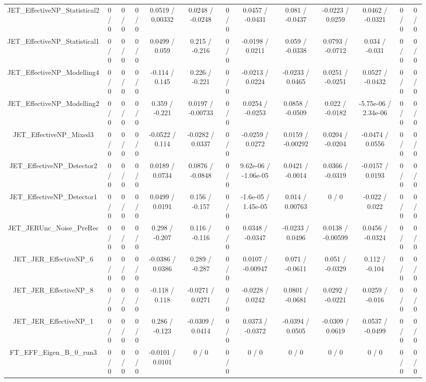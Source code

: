 \documentclass[10pt]{article}
\begin{document}
\begin{table}[htbp]
\begin{center}
\begin{tabular}{|c|c|c|c|c|c|c|c|c|c|c|c|c|}
  JET_EffectiveNP_Statistical2 & 0 / 0 & 0 / 0 & 0 / 0 & 0.0519 / 0.00332 & 0.0248 / -0.0248 & 0 / 0 & 0.0457 / -0.0431 & 0.081 / -0.0437 & -0.0223 / 0.0259 & 0.0462 / -0.0321 & 0 / 0 & 0 / 0 \\ 
  JET_EffectiveNP_Statistical1 & 0 / 0 & 0 / 0 & 0 / 0 & 0.0499 / 0.059 & 0.215 / -0.216 & 0 / 0 & -0.0198 / 0.0211 & 0.059 / -0.0338 & 0.0793 / -0.0712 & 0.034 / -0.031 & 0 / 0 & 0 / 0 \\ 
  JET_EffectiveNP_Modelling4 & 0 / 0 & 0 / 0 & 0 / 0 & -0.114 / 0.145 & 0.226 / -0.221 & 0 / 0 & -0.0213 / 0.0224 & -0.0233 / 0.0465 & 0.0251 / -0.0251 & 0.0527 / -0.0432 & 0 / 0 & 0 / 0 \\ 
  JET_EffectiveNP_Modelling2 & 0 / 0 & 0 / 0 & 0 / 0 & 0.359 / -0.221 & 0.0197 / -0.00733 & 0 / 0 & 0.0254 / -0.0253 & 0.0858 / -0.0509 & 0.022 / -0.0182 & -5.75e-06 / 2.34e-06 & 0 / 0 & 0 / 0 \\ 
  JET_EffectiveNP_Mixed3 & 0 / 0 & 0 / 0 & 0 / 0 & -0.0522 / 0.114 & -0.0282 / 0.0337 & 0 / 0 & -0.0259 / 0.0272 & 0.0159 / -0.00292 & 0.0204 / -0.0204 & -0.0474 / 0.0556 & 0 / 0 & 0 / 0 \\ 
  JET_EffectiveNP_Detector2 & 0 / 0 & 0 / 0 & 0 / 0 & 0.0189 / 0.0734 & 0.0876 / -0.0848 & 0 / 0 & 9.62e-06 / -1.06e-05 & 0.0421 / -0.0014 & 0.0366 / -0.0319 & -0.0157 / 0.0193 & 0 / 0 & 0 / 0 \\ 
  JET_EffectiveNP_Detector1 & 0 / 0 & 0 / 0 & 0 / 0 & 0.0499 / 0.0191 & 0.156 / -0.157 & 0 / 0 & -1.6e-05 / 1.45e-05 & 0.014 / 0.00763 & 0 / 0 & -0.022 / 0.022 & 0 / 0 & 0 / 0 \\ 
  JET_JERUnc_Noise_PreRec & 0 / 0 & 0 / 0 & 0 / 0 & 0.298 / -0.207 & 0.116 / -0.116 & 0 / 0 & 0.0348 / -0.0347 & -0.0233 / 0.0496 & 0.0138 / -0.00599 & 0.0456 / -0.0324 & 0 / 0 & 0 / 0 \\ 
  JET_JER_EffectiveNP_6 & 0 / 0 & 0 / 0 & 0 / 0 & -0.0386 / 0.0386 & 0.289 / -0.287 & 0 / 0 & 0.0107 / -0.00947 & 0.071 / -0.0611 & 0.051 / -0.0329 & 0.112 / -0.104 & 0 / 0 & 0 / 0 \\ 
  JET_JER_EffectiveNP_8 & 0 / 0 & 0 / 0 & 0 / 0 & -0.118 / 0.118 & -0.0271 / 0.0271 & 0 / 0 & -0.0228 / 0.0242 & 0.0801 / -0.0681 & 0.0292 / -0.0221 & 0.0259 / -0.016 & 0 / 0 & 0 / 0 \\ 
  JET_JER_EffectiveNP_1 & 0 / 0 & 0 / 0 & 0 / 0 & 0.286 / -0.123 & -0.0309 / 0.0414 & 0 / 0 & 0.0373 / -0.0372 & -0.0394 / 0.0505 & -0.0309 / 0.0619 & 0.0537 / -0.0499 & 0 / 0 & 0 / 0 \\ 
  FT_EFF_Eigen_B_0_run3 & 0 / 0 & 0 / 0 & 0 / 0 & -0.0101 / 0.0101 & 0 / 0 & 0 / 0 & 0 / 0 & 0 / 0 & 0 / 0 & 0 / 0 & 0 / 0 & 0 / 0 \\ 

\end{tabular}
\end{center}
\end{table}
\end{document}
